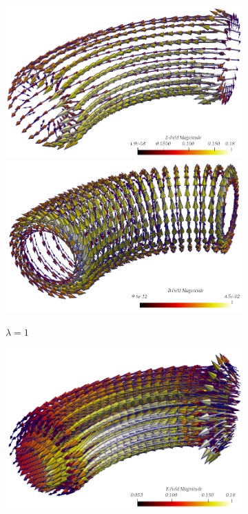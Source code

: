 \documentclass{article}
\begin{document}
\begin{figure}
    \centering
    \begin{subfigure}[b]{\textwidth}
        \centering
        \includegraphics[scale=0.3]{paper_version/E-field_lamnbda-1_bend.png}\hspace{1cm}
        \includegraphics[scale=0.3]{paper_version/B-field_lamnbda-1_bend.png}
        \caption{\colorbox{yellow!30}{$\lambda = 1$}}
    \end{subfigure}
    \begin{subfigure}[b]{\textwidth}
        \centering
        \includegraphics[scale=0.3]{paper_version/E-field_lamnbda-0_bend.png}\hspace{1cm}

\end{subfigure}
\end{figure}
\end{document}
